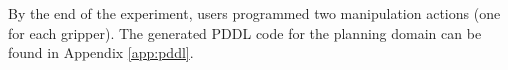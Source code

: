 %
By the end of the experiment, users programmed two manipulation actions (one for each gripper).
The generated PDDL code for the planning domain can be found in Appendix \ref{app:pddl}.





